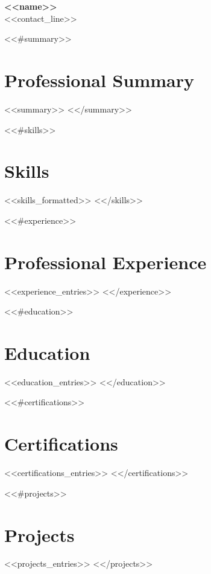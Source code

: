 \documentclass[11pt,a4paper]{article}
\begin{document}
\begin{center}
{\LARGE\bfseries <<name>>}\\[4pt]
<<contact_line>>
\end{center}

\vspace{4pt}

<<#summary>>
\section{Professional Summary}
<<summary>>
<</summary>>

<<#skills>>
\section{Skills}
<<skills_formatted>>
<</skills>>

<<#experience>>
\section{Professional Experience}
<<experience_entries>>
<</experience>>

<<#education>>
\section{Education}
<<education_entries>>
<</education>>

<<#certifications>>
\section{Certifications}
<<certifications_entries>>
<</certifications>>

<<#projects>>
\section{Projects}
<<projects_entries>>
<</projects>>
\end{document}
